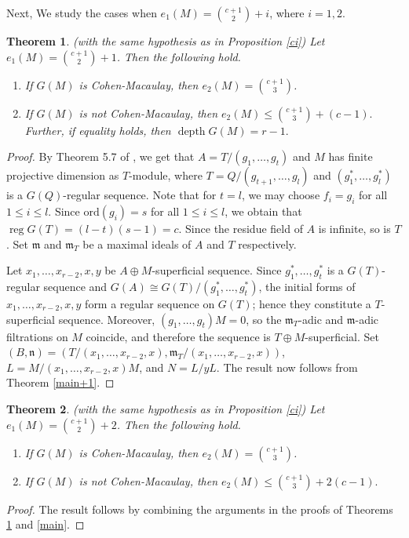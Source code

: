 \documentclass[11pt]{amsart}
\theoremstyle{plain}
\newtheorem{theorem}{Theorem}[section]
\newcommand{\m}{\mathfrak{m}}
\newcommand{\n}{\mathfrak{n}}
\newcommand{\depth}{\operatorname{depth}}
\theoremstyle{plain}
\begin{document}
Next, We study the cases when $e_1(M)=\binom{c+1}{2}+i$, where $i=1,2$.
\begin{theorem}\label{ci1}
(with the same hypothesis as in Proposition \ref{ci}) Let $e_1(M)= \binom{c+1}{2}+1$. Then the following hold.
\begin{enumerate}
    \item If $G(M)$ is Cohen-Macaulay, then $e_2(M)=\binom{c+1}{3}$.
    \item If $G(M)$ is not Cohen-Macaulay, then $e_2(M)\leq \binom{c+1}{3}+(c-1).$ Further, if equality holds, then $\depth G(M)=r-1.$
\end{enumerate}
\end{theorem}
\begin{proof}
    By Theorem 5.7 of \cite{Quasipure}, we get that $A=T/(g_1,\ldots ,g_t)$ and $M$ has finite projective dimension as $T$-module, where $T=Q/(g_{t+1},\ldots ,g_l)$ and $(g_1^*,\ldots ,g_l^*)$ is a $G(Q)$-regular sequence. Note that for $t=l$, we may choose $f_i=g_i$ for all $1\leq i\leq l.$ Since  $\text{ord}(g_i)=s$ for all $1\leq i\leq l$, we obtain that $\operatorname{reg} G(T)=(l-t)(s-1)=c$. Since the residue field of $A$ is infinite, so is $T$. Set $\m$ and $\m_T$ be a maximal ideals of $A$ and $T$ respectively.
    
    Let $x_1,\ldots ,x_{r-2},x,y$ be $A\oplus M$-superficial sequence. Since $g_1^*,\ldots,g_t^*$ is a $G(T)$-regular sequence and $G(A)\cong G(T)/(g_1^*,\ldots,g_t^*)$, the initial forms of $x_1,\ldots,x_{r-2},x,y$ form a regular sequence on $G(T)$; hence they constitute a $T$-superficial sequence. Moreover, $(g_1,\ldots,g_t)M=0$, so the $\mathfrak m_T$-adic and $\mathfrak m$-adic filtrations on $M$ coincide, and therefore the sequence is $T\oplus M$-superficial. Set $(B,\n)=(T/(x_1,\ldots ,x_{r-2},x),\m_T/(x_1,\ldots ,x_{r-2},x))$, $L=M/(x_1,\ldots ,x_{r-2},x)M$, and $N=L/yL$. The result now follows from Theorem \ref{main+1}.
\end{proof}

\begin{theorem}\label{ci2}
(with the same hypothesis as in Proposition \ref{ci}) Let $e_1(M)= \binom{c+1}{2}+2$. Then the following hold.
\begin{enumerate}
    \item If $G(M)$ is Cohen-Macaulay, then $e_2(M)=\binom{c+1}{3}$.
    \item If $G(M)$ is not Cohen-Macaulay, then $e_2(M)\leq \binom{c+1}{3}+2(c-1).$
\end{enumerate}
\end{theorem}
\begin{proof}
   The result follows by combining the arguments in the proofs of Theorems \ref{ci1} and \ref{main}.
\end{proof}
\end{document}
